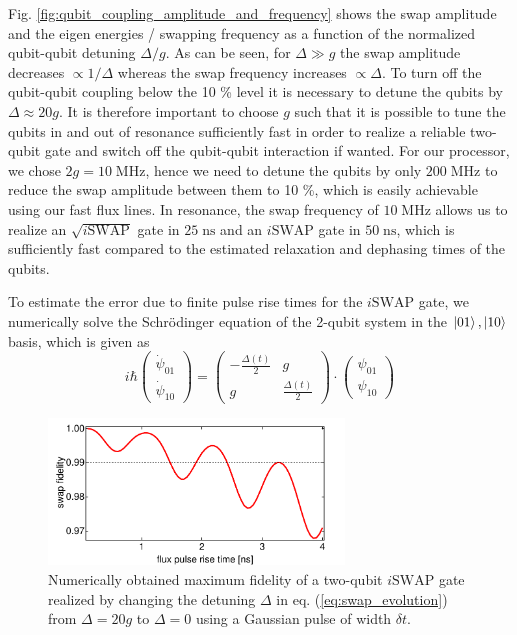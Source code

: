 Fig. \ref{fig:qubit_coupling_amplitude_and_frequency} shows the swap amplitude and the eigen energies / swapping frequency as a function of the normalized qubit-qubit detuning $\Delta/g$. As can be seen, for $\Delta \gg g$ the swap amplitude decreases $\propto 1/\Delta$ whereas the swap frequency increases $\propto \Delta$. To turn off the qubit-qubit coupling below the 10 \% level it is necessary to detune the qubits by $\Delta \approx 20 g$. It is therefore important to choose $g$ such that it is possible to tune the qubits in and out of resonance sufficiently fast in order to realize a reliable two-qubit gate and switch off the qubit-qubit interaction if wanted. For our processor, we chose $2g = 10\;\mathrm{MHz}$, hence we need to detune the qubits by only $200\;\mathrm{MHz}$ to reduce the swap amplitude between them to 10 \%, which is easily achievable using our fast flux lines. In resonance, the swap frequency of $10\;\mathrm{MHz}$ allows us to realize an $\sqrt{i\mathrm{SWAP}}$ gate in $25\;\mathrm{ns}$ and an $i\mathrm{SWAP}$ gate in $50\;\mathrm{ns}$, which is sufficiently fast compared to the estimated relaxation and dephasing times of the qubits.

\smallskip

To estimate the error due to finite pulse rise times for the $i\mathrm{SWAP}$ gate, we numerically solve the Schrödinger equation of the 2-qubit system in the $\left| 01 \right>,\left| 10 \right>$ basis, which is given as
%
\begin{equation}
i\hbar\left(\begin{array}{c} \dot{\psi}_{01} \\ \dot{\psi}_{10} \end{array}\right) = \left( \begin{array}{cc} -\frac{\Delta(t)}{2} & g \\ g & \frac{\Delta(t)}{2}  \end{array} \right)\cdot \left(\begin{array}{c} \psi_{01} \\ \psi_{10} \end{array}\right) \label{eq:swap_evolution}
\end{equation}
%

\begin{figure}
	\centering
	\includegraphics[width=0.7\textwidth]{./material/mathematica/qubit_qubit_swap_error}
	\caption[]{Numerically obtained maximum fidelity of a two-qubit $i\mathrm{SWAP}$ gate realized by changing the detuning $\Delta$ in eq. (\ref{eq:swap_evolution}) from $\Delta = 20g$ to $\Delta=0$ using a Gaussian pulse of width $\delta t$.}
	\label{fig:qubit_qubit_coupling_swap_error}
\end{figure}

